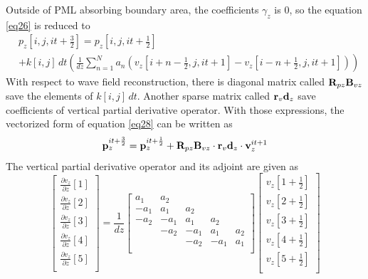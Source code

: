 \documentclass[revised,endfloat]{geophysics}
\begin{document}
Outside of PML absorbing boundary area, the coefficients $\gamma_z$ is $0$, so the equation \ref{eq26} is reduced to 
\begin{equation}
\begin{split}
& p_z[i,j,it+\frac{3}{2}] = p_z[i,j,it+\frac{1}{2}]  \\
& + k[i,j] \, dt \left(\frac{1}{dz} \sum_{n=1}^N  a_n \left( v_z[i+n-\frac{1}{2},j,it+1] - v_z[i-n+\frac{1}{2},j,it+1] \right)  \right)
\end{split}
\label{eq28}
\end{equation}
With respect to wave field reconstruction, there is diagonal matrix called ${\bf R}_{pz}{\bf B}_{vz}$ save the elements of $k[i,j] \, dt$. Another sparse matrix called ${\bf r}_v{\bf d}_z$ save coefficients of vertical partial derivative operator. With those expressions, the vectorized form of equation \ref{eq28} can be written as
\begin{equation}
{\bf p}_z^{it+\frac{3}{2}} =  {\bf p}_z^{it+\frac{1}{2}} +  {\bf R}_{pz}{\bf B}_{vz} \cdot {\bf r}_v{\bf d}_z \cdot {\bf v}_z^{it+1}
\label{eq29}
\end{equation}
The vertical partial derivative operator and its adjoint are given as
\begin{equation}
\begin{bmatrix}
\frac{\partial v_z}{\partial z}[1] \\
\frac{\partial v_z}{\partial z}[2] \\
\frac{\partial v_z}{\partial z}[3] \\
\frac{\partial v_z}{\partial z}[4] \\
\frac{\partial v_z}{\partial z}[5] \\
\end{bmatrix}
= \frac{1}{dz} \begin{bmatrix}
a_1 & a_2 & & &\\
-a_1& a_1 & a_2 & & \\
-a_2& -a_1 & a_1 & a_2 & \\
& -a_2 & -a_1 & a_1 & a_2 \\
& & -a_2 & -a_1 & a_1 \\
\end{bmatrix}
\begin{bmatrix}
v_z[1+\frac{1}{2}] \\
v_z[2+\frac{1}{2}] \\
v_z[3+\frac{1}{2}] \\
v_z[4+\frac{1}{2}] \\
v_z[5+\frac{1}{2}] \\
\end{bmatrix}
\label{eq30}
\end{equation}
\end{document}
